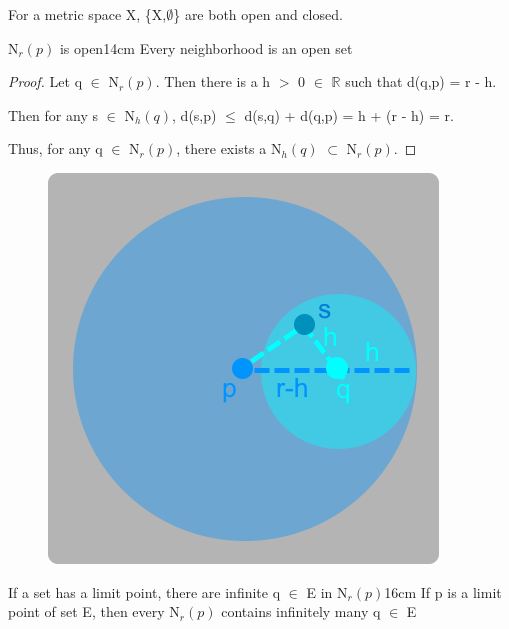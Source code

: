 	\hspace{0.7cm}
	For a metric space X, \{X,$\emptyset$\} are both open and closed.

	\vspace{0.5cm}



	\begin{wtheorem}{N$_r(p)$ is open}{14cm}
		Every neighborhood is an open set
	\end{wtheorem}
	
	\begin{proof}
		Let q $\in$ N$_r(p)$. Then there is a h $>$ 0 $\in$ $\mathbb{R}$
		such that d(q,p) = r - h.

		Then for any s $\in$ N$_h(q)$,
		d(s,p) $\leq$  d(s,q) + d(q,p) = h + (r - h) = r.

		Thus, for any q $\in$ N$_r(p)$, there exists a N$_h(q)$ $\subset$ N$_r(p)$.
	\end{proof}



	\begin{figure}[h]
		\centering
		\includegraphics[scale=0.34]{Images/5.1.3.png}
	\end{figure}

	\newpage



	\begin{wtheorem}{If a set has a limit point, there are infinite q
	$\in$ E in N$_r(p)$}{16cm}
		If p is a limit point of set E, then every N$_r(p)$
		contains infinitely many q $\in$ E
	\end{wtheorem}
	
